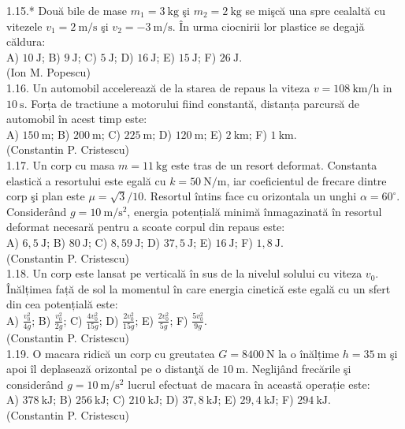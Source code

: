 1.15.* Două bile de mase $m_{1}=3 \mathrm{~kg}$ şi $m_{2}=2 \mathrm{~kg}$ se mişcă una spre cealaltă cu vitezele $v_{1}=2 \mathrm{~m} / \mathrm{s}$ şi $v_{2}=-3 \mathrm{~m} / \mathrm{s}$. În urma ciocnirii lor plastice se degajă căldura:\\ A) $10 \mathrm{~J}$; B) $9 \mathrm{~J}$; C) $5 \mathrm{~J}$; D) $16 \mathrm{~J}$; E) $15 \mathrm{~J}$; F) $26 \mathrm{~J}$.\\ (Ion M. Popescu)\\

1.16. Un automobil accelerează de la starea de repaus la viteza $v=108 \mathrm{~km} / \mathrm{h}$ in $10 \mathrm{~s}$. Forța de tractiune a motorului fiind constantă, distanța parcursă de automobil în acest timp este:\\ A) $150 \mathrm{~m}$; B) $200 \mathrm{~m}$; C) $225 \mathrm{~m}$; D) $120 \mathrm{~m}$; E) $2 \mathrm{~km}$; F) $1 \mathrm{~km}$.\\ (Constantin P. Cristescu)\\

1.17. Un corp cu masa $m=11 \mathrm{~kg}$ este tras de un resort deformat. Constanta elastică a resortului este egală cu $k=50 \mathrm{~N} / \mathrm{m}$, iar coeficientul de frecare dintre corp şi plan este $\mu=\sqrt{3} / 10$. Resortul întins face cu orizontala un unghi $\alpha=60^{\circ}$. Considerând $g=10 \mathrm{~m} / \mathrm{s}^{2}$, energia potențială minimă înmagazinată în resortul deformat necesară pentru a scoate corpul din repaus este:\\ A) $6,5 \mathrm{~J}$; B) $80 \mathrm{~J}$; C) $8,59 \mathrm{~J}$; D) $37,5 \mathrm{~J}$; E) $16 \mathrm{~J}$; F) $1,8 \mathrm{~J}$.\\ (Constantin P. Cristescu)\\

1.18. Un corp este lansat pe verticală în sus de la nivelul solului cu viteza $v_{0}$. Înălțimea față de sol la momentul în care energia cinetică este egală cu un sfert din cea potențială este:\\ A) $\frac{v_{0}^{2}}{4 g}$; B) $\frac{v_{0}^{2}}{2 g}$; C) $\frac{4 v_{0}^{2}}{15 g}$; D) $\frac{2 v_{0}^{2}}{15 g}$; E) $\frac{2 v_{0}^{2}}{5 g}$; F) $\frac{5 v_{0}^{2}}{9 g}$.\\ (Constantin P. Cristescu)\\

1.19. O macara ridică un corp cu greutatea $G=8400 \mathrm{~N}$ la o înălțime $h=35 \mathrm{~m}$ şi apoi îl deplasează orizontal pe o distanţă de $10 \mathrm{~m}$. Neglijând frecările şi considerând $g=10 \mathrm{~m} / \mathrm{s}^{2}$ lucrul efectuat de macara în această operație este:\\ A) $378 \mathrm{~kJ}$; B) $256 \mathrm{~kJ}$; C) $210 \mathrm{~kJ}$; D) $37,8 \mathrm{~kJ}$; E) $29,4 \mathrm{~kJ}$; F) $294 \mathrm{~kJ}$.\\ (Constantin P. Cristescu)\\


